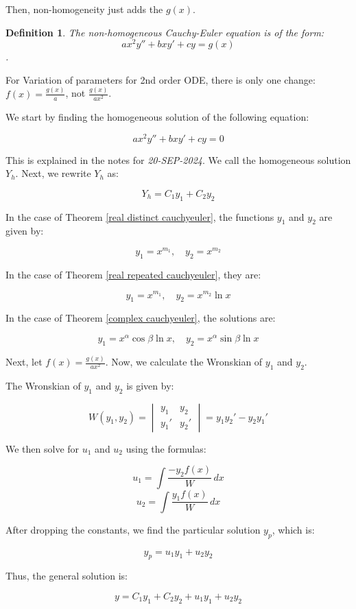 \documentclass{article}
\newtheorem{defn}{Definition}
\theoremstyle{definition}
\begin{document}
Then, non-homogeneity just adds the $g(x)$.
\begin{defn}
    The non-homogeneous Cauchy-Euler equation is of the form:
    \[ ax^2y'' + bxy' + cy = g(x) \]. 
\end{defn}

For Variation of parameters for 2nd order ODE, there is only one change: $f(x) = \frac{g(x)}{a}$, not $\frac{g(x)}{ax^2}$.

We start by finding the homogeneous solution of the following equation:

\[
ax^2 y'' + bxy' + cy = 0
\]

This is explained in the notes for \textit{20-SEP-2024}. We call the homogeneous solution \( Y_h \). Next, we rewrite \( Y_h \) as:

\[
Y_h = C_1 y_1 + C_2 y_2
\]

In the case of Theorem \ref{real distinct cauchyeuler}, the functions \( y_1 \) and \( y_2 \) are given by:

\[
y_1 = x^{m_1}, \quad y_2 = x^{m_2}
\]

In the case of Theorem \ref{real repeated cauchyeuler}, they are:

\[
y_1 = x^{m_1}, \quad y_2 = x^{m_2} \ln{x}
\]

In the case of Theorem \ref{complex cauchyeuler}, the solutions are:

\[
y_1 = x^\alpha \cos{\beta \ln{x}}, \quad y_2 = x^\alpha \sin{\beta \ln{x}}
\]

Next, let \( f(x) = \frac{g(x)}{ax^2} \). Now, we calculate the Wronskian of \( y_1 \) and \( y_2 \).

The Wronskian of \( y_1 \) and \( y_2 \) is given by:

\[
W(y_1, y_2) =
\begin{vmatrix}
y_1 & y_2 \\
y_1' & y_2'
\end{vmatrix}
= y_1 y_2' - y_2 y_1'
\]

We then solve for \( u_1 \) and \( u_2 \) using the formulas:

\[
u_1 = \int \frac{-y_2 f(x)}{W} \, dx
\]
\[
u_2 = \int \frac{y_1 f(x)}{W} \, dx
\]

After dropping the constants, we find the particular solution \( y_p \), which is:

\[
y_p = u_1 y_1 + u_2 y_2
\]

Thus, the general solution is:

\[
y = C_1 y_1 + C_2 y_2 + u_1 y_1 + u_2 y_2
\]
\end{document}
